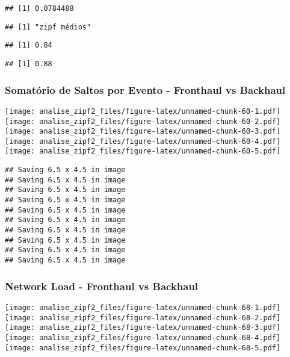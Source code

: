 \documentclass[
]{article}
\begin{document}
\begin{verbatim}
## [1] 0.0784488
\end{verbatim}

\begin{verbatim}
## [1] "zipf médios"
\end{verbatim}

\begin{verbatim}
## [1] 0.84
\end{verbatim}

\begin{verbatim}
## [1] 0.88
\end{verbatim}

\hypertarget{somatuxf3rio-de-saltos-por-evento---fronthaul-vs-backhaul}{%
\subsubsection{Somatório de Saltos por Evento - Fronthaul vs
Backhaul}\label{somatuxf3rio-de-saltos-por-evento---fronthaul-vs-backhaul}}

\texttt{[image: analise\_zipf2\_files/figure-latex/unnamed-chunk-60-1.pdf]}
\texttt{[image: analise\_zipf2\_files/figure-latex/unnamed-chunk-60-2.pdf]}
\texttt{[image: analise\_zipf2\_files/figure-latex/unnamed-chunk-60-3.pdf]}
\texttt{[image: analise\_zipf2\_files/figure-latex/unnamed-chunk-60-4.pdf]}
\texttt{[image: analise\_zipf2\_files/figure-latex/unnamed-chunk-60-5.pdf]}

\begin{verbatim}
## Saving 6.5 x 4.5 in image
## Saving 6.5 x 4.5 in image
## Saving 6.5 x 4.5 in image
## Saving 6.5 x 4.5 in image
## Saving 6.5 x 4.5 in image
## Saving 6.5 x 4.5 in image
## Saving 6.5 x 4.5 in image
## Saving 6.5 x 4.5 in image
## Saving 6.5 x 4.5 in image
## Saving 6.5 x 4.5 in image
\end{verbatim}

\hypertarget{network-load---fronthaul-vs-backhaul}{%
\subsubsection{Network Load - Fronthaul vs
Backhaul}\label{network-load---fronthaul-vs-backhaul}}

\texttt{[image: analise\_zipf2\_files/figure-latex/unnamed-chunk-68-1.pdf]}
\texttt{[image: analise\_zipf2\_files/figure-latex/unnamed-chunk-68-2.pdf]}
\texttt{[image: analise\_zipf2\_files/figure-latex/unnamed-chunk-68-3.pdf]}
\texttt{[image: analise\_zipf2\_files/figure-latex/unnamed-chunk-68-4.pdf]}
\texttt{[image: analise\_zipf2\_files/figure-latex/unnamed-chunk-68-5.pdf]}
\end{document}
